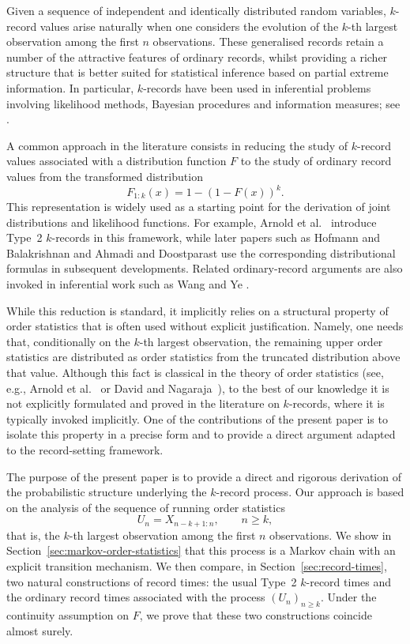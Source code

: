 \documentclass[12pt]{article}
\theoremstyle{definition}
\begin{document}
Given a sequence of independent and identically distributed random variables, $k$-record values arise naturally when one considers the evolution of the $k$-th largest observation among the first $n$ observations. These generalised records retain a number of the attractive features of ordinary records, whilst providing a richer structure that is better suited for statistical inference based on partial extreme information. In particular, $k$-records have been used in inferential problems involving likelihood methods, Bayesian procedures and information measures; see \cite{HofmannBalakrishnan2004,AhmadiDoostparast2008,WangYe2015}.

A common approach in the literature consists in reducing the study of $k$-record values associated with a distribution function $F$ to the study of ordinary record values from the transformed distribution
\[
F_{1:k}(x)=1-(1-F(x))^k.
\]
This representation is widely used as a starting point for the derivation of joint distributions and likelihood functions. For example, Arnold et al.\ \cite[p.~43]{ArnoldBalakrishnanNagaraja1998} introduce Type~2 $k$-records in this framework, while later papers such as Hofmann and Balakrishnan \cite{HofmannBalakrishnan2004} and Ahmadi and Doostparast \cite{AhmadiDoostparast2008} use the corresponding distributional formulas in subsequent developments. Related ordinary-record arguments are also invoked in inferential work such as Wang and Ye \cite{WangYe2015}.

While this reduction is standard, it implicitly relies on a structural property of order statistics that is often used without explicit justification. Namely, one needs that, conditionally on the $k$-th largest observation, the remaining upper order statistics are distributed as order statistics from the truncated distribution above that value. Although this fact is classical in the theory of order statistics (see, e.g., Arnold et al.~\cite[pp.~18--19]{ArnoldBalakrishnanNagaraja1998} or David and Nagaraja~\cite[Sec.~2.4--2.5]{DavidNagaraja2003}), to the best of our knowledge it is not explicitly formulated and proved in the literature on $k$-records, where it is typically invoked implicitly.
One of the contributions of the present paper is to isolate this property in a precise form and to provide a direct argument adapted to the record-setting framework.

The purpose of the present paper is to provide a direct and rigorous derivation of the probabilistic structure underlying the $k$-record process. Our approach is based on the analysis of the sequence of running order statistics
\[
U_n=X_{n-k+1:n}, \qquad n\ge k,
\]
that is, the $k$-th largest observation among the first $n$ observations. We show in Section~\ref{sec:markov-order-statistics} that this process is a Markov chain with an explicit transition mechanism. We then compare, in Section~\ref{sec:record-times}, two natural constructions of record times: the usual Type~2 $k$-record times and the ordinary record times associated with the process $(U_n)_{n\ge k}$. Under the continuity assumption on $F$, we prove that these two constructions coincide almost surely.
\end{document}
